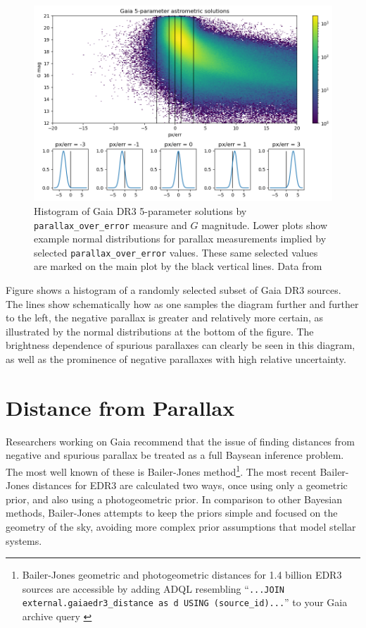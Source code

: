 \documentclass[twocolumn]{aastex631}
\begin{document}
\begin{figure}
	\includegraphics[width=\columnwidth]{poe_map.png}
	\caption{Histogram of Gaia DR3 5-parameter solutions by \texttt{parallax\_over\_error} measure and $G$ magnitude. Lower plots show example normal distributions for parallax measurements implied by selected \texttt{parallax\_over\_error} values. These same selected values are marked on the main plot by the black vertical lines. Data from \cite{collaborationGaia2022}}
	\label{fig:dr3poe}
\end{figure}

Figure \label{fig:dr3poe} shows a histogram of a randomly selected subset of Gaia DR3 sources. The lines show schematically how as one samples the diagram further and further to the left, the negative parallax is greater and relatively more certain, as illustrated by the normal distributions at the bottom of the figure. The brightness dependence of spurious parallaxes can clearly be seen in this diagram, as well as the prominence of negative parallaxes with high relative uncertainty. 


\section{Distance from Parallax} \label{sec:distance}

Researchers working on Gaia recommend that the issue of finding distances from negative and spurious parallax be treated as a full Baysean inference problem\citep{luriGaia2018}. The most well known of these is Bailer-Jones method\footnote{Bailer-Jones geometric and photogeometric distances for 1.4 billion EDR3 sources are accessible by adding ADQL resembling ``\texttt{...JOIN external.gaiaedr3\_distance as d USING (source\_id)...}'' to your Gaia archive query \citep{bailer-jonesEstimating2021}}. The most recent Bailer-Jones distances for EDR3 are calculated two ways, once using only a geometric prior, and also using a photogeometric prior. In comparison to other Bayesian methods, Bailer-Jones attempts to keep the priors simple and focused on the geometry of the sky, avoiding more complex prior assumptions that model stellar systems.
\end{document}
